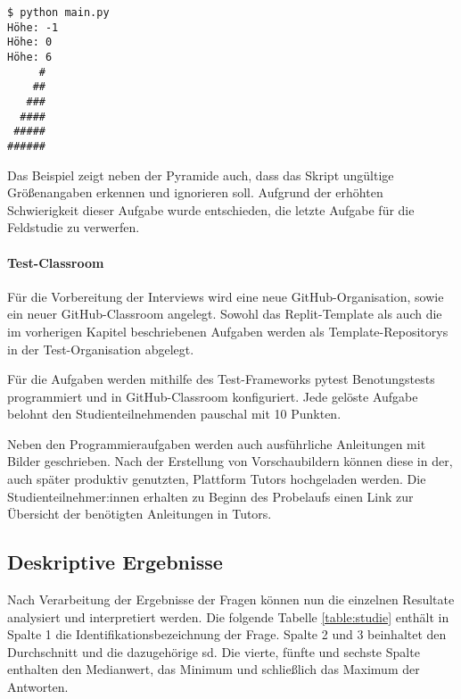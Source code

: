 \begin{lstlisting}[style=Bash]
$ python main.py
Höhe: -1
Höhe: 0
Höhe: 6
     #
    ##
   ###
  ####
 #####
######
\end{lstlisting}

Das Beispiel zeigt neben der Pyramide auch, dass das Skript ungültige
Größenangaben erkennen und ignorieren soll. Aufgrund der erhöhten Schwierigkeit
dieser Aufgabe wurde entschieden, die letzte Aufgabe für die Feldstudie zu
verwerfen.

\paragraph{Test-Classroom}
Für die Vorbereitung der Interviews wird eine neue GitHub-Organisation, sowie
ein neuer GitHub-Classroom angelegt. Sowohl das Replit-Template als auch die im
vorherigen Kapitel beschriebenen Aufgaben werden als Template-Repositorys in
der Test-Organisation abgelegt.

Für die Aufgaben werden mithilfe des Test-Frameworks pytest Benotungstests
programmiert und in GitHub-Classroom konfiguriert. Jede gelöste Aufgabe belohnt
den Studienteilnehmenden pauschal mit 10 Punkten.

Neben den Programmieraufgaben werden auch ausführliche Anleitungen mit Bilder
geschrieben. Nach der Erstellung von Vorschaubildern können diese in der,
auch später produktiv genutzten, Plattform Tutors hochgeladen werden. Die
Studienteilnehmer:innen erhalten zu Beginn des Probelaufs einen Link zur
Übersicht der benötigten Anleitungen in Tutors.

\newpage
\subsection{Deskriptive Ergebnisse}
Nach Verarbeitung der Ergebnisse der Fragen können nun die einzelnen Resultate
analysiert und interpretiert werden. Die folgende Tabelle \ref{table:studie}
enthält in Spalte 1 die Identifikationsbezeichnung der Frage. Spalte 2 und
3 beinhaltet den Durchschnitt und die dazugehörige \ac{sd}. Die vierte, fünfte
und sechste Spalte enthalten den Medianwert, das Minimum und schließlich das
Maximum der Antworten.

